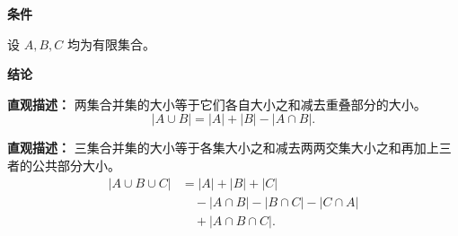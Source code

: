 \begin{statementbox}
	\textbf{\textcolor{CStatement}{条件}}
	\begin{description}[style=nextline, leftmargin=2.8em, labelsep=0.5em, itemsep=0.35em]
		\item[\textbf{\textcolor{CStatement}{条件 1（集合有限）：}}]
			设 $A,B,C$ 均为有限集合。
	\end{description}
	\textbf{\textcolor{CStatement}{结论}}
	\begin{description}[style=nextline, leftmargin=2.8em, labelsep=0.5em, itemsep=0.45em]
		\item[\textbf{\textcolor{CStatement}{结论一（两集合并集）：}}]
			\textbf{\textcolor{CStatement}{直观描述：}}
			两集合并集的大小等于它们各自大小之和减去重叠部分的大小。
			\[
				|A\cup B| = |A| + |B| - |A\cap B|.
			\]
		\item[\textbf{\textcolor{CStatement}{推广结论（三集合并集）：}}]
			\textbf{\textcolor{CStatement}{直观描述：}}
			三集合并集的大小等于各集大小之和减去两两交集大小之和再加上三者的公共部分大小。
			\[
				\begin{aligned}
					|A\cup B\cup C| &= |A| + |B| + |C| \\ &\quad - |A\cap B| - |B\cap C| - |C\cap A| \\ &\quad + |A\cap B\cap C|.
			\end{aligned}
			\]
	\end{description}

\end{statementbox}
